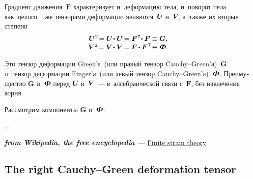 \begin{otherlanguage}{russian}
Градиент движения~$\bm{F}$ характеризует и~деформацию тела, и~поворот тела как~целого. ~же тензорами деформации являются~${\bm{U}\hspace{-0.25ex}}$ и~${\bm{V}\hspace{-0.4ex}}$, а~также их вторые степени
\nopagebreak\vspace{.12em}\begin{equation}\label{deformationmeasures}
\begin{array}{c}
\bm{U}^2 \hspace{-0.32ex} = \bm{U} \hspace{-0.32ex} \dotp \bm{U} \hspace{-0.25ex} = \bm{F}^{\hspace{.1ex}\T} \hspace{-0.5ex} \dotp \bm{F} \equiv \bm{G} , \\[.1ex]
\bm{V}^2 \hspace{-0.32ex} = \bm{V} \hspace{-0.32ex} \dotp \bm{V} \hspace{-0.25ex} = \bm{F} \hspace{-0.1ex} \dotp \bm{F}^{\hspace{.1ex}\T} \hspace{-0.36ex} \equiv \mathboldPhi .
\end{array}
\end{equation}

\vspace{-0.25em} \noindent Это тензор деформации Green’а~(или правый тензор Cauchy--Green’а)~$\bm{G}$ и~тензор деформации Finger’а~(или левый тензор Cauchy--Green’а)~$\mathboldPhi$. Пре\-иму\-щест\-во $\bm{G}$ и~$\mathboldPhi$ перед ${\bm{U}\hspace{-0.25ex}}$ и~${\bm{V}\hspace{-0.25ex}}$~--- в~алгебраической связи с~$\bm{F}$, без извлечения корня.

Рассмотрим компоненты $\bm{G}$ и~$\mathboldPhi$:


...

\vspace{1cm}

{\small%
\setlength{\abovedisplayskip}{2pt}\setlength{\belowdisplayskip}{2pt}

\noindent \textbf{\emph{from Wikipedia, the free encyclopedia}}~--- \href{https://en.wikipedia.org/wiki/Finite_strain_theory}{Finite strain theory}

\subsection*{The right Cauchy\hbox{--}Green deformation tensor}

}
\end{otherlanguage}
